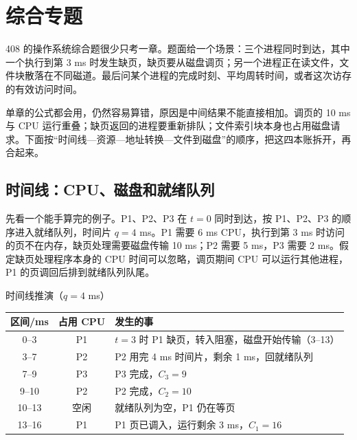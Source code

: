 \section{综合专题}

408 的操作系统综合题很少只考一章。题面给一个场景：三个进程同时到达，其中一个执行到第 3 ms 时发生缺页，缺页要从磁盘调页；另一个进程正在读文件，文件块散落在不同磁道。最后问某个进程的完成时刻、平均周转时间，或者这次访存的有效访问时间。

单章的公式都会用，仍然容易算错，原因是中间结果不能直接相加。调页的 10 ms 与 CPU 运行重叠；缺页返回的进程要重新排队；文件索引块本身也占用磁盘请求。下面按“时间线—资源—地址转换—文件到磁盘”的顺序，把这四本账拆开，再合起来。

\subsection{时间线：CPU、磁盘和就绪队列}

先看一个能手算完的例子。P1、P2、P3 在 $t=0$ 同时到达，按 P1、P2、P3 的顺序进入就绪队列，时间片 $q=4$ ms。P1 需要 6 ms CPU，执行到第 3 ms 时访问的页不在内存，缺页处理需要磁盘传输 10 ms；P2 需要 5 ms，P3 需要 2 ms。假定缺页处理程序本身的 CPU 时间可以忽略，调页期间 CPU 可以运行其他进程，P1 的页调回后排到就绪队列队尾。

\begin{tablebox}{时间线推演（$q=4$ ms）}
\centering
\small
\begin{tabularx}{\linewidth}{|c|c|X|}
\hline
区间/ms & 占用 CPU & 发生的事 \\
\hline
0--3 & P1 & $t=3$ 时 P1 缺页，转入阻塞，磁盘开始传输（3--13） \\
3--7 & P2 & P2 用完 4 ms 时间片，剩余 1 ms，回就绪队列 \\
7--9 & P3 & P3 完成，$C_3=9$ \\
9--10 & P2 & P2 完成，$C_2=10$ \\
10--13 & 空闲 & 就绪队列为空，P1 仍在等页 \\
13--16 & P1 & P1 页已调入，运行剩余 3 ms，$C_1=16$ \\
\hline
\end{tabularx}
\end{tablebox}

